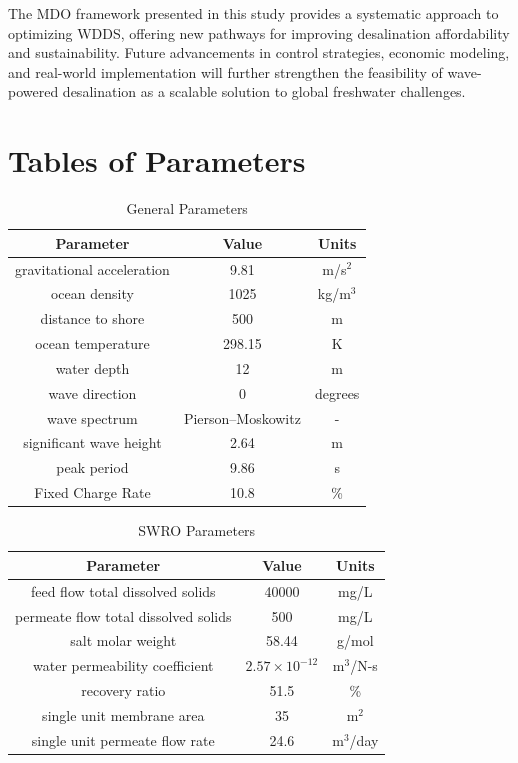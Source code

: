 \documentclass[twocolumn,10pt]{asme2e}
\begin{document}
The MDO framework presented in this study provides a systematic approach to optimizing WDDS, offering new pathways for improving desalination affordability and sustainability. Future advancements in control strategies, economic modeling, and real-world implementation will further strengthen the feasibility of wave-powered desalination as a scalable solution to global freshwater challenges.




\appendix
\newpage
\section{Tables of Parameters} \label{app:params}
\begin{table}[h]
    \centering
    \caption{General Parameters}
    \begin{tabular}{|c|c|c|}
        \hline
        \textbf{Parameter} & \textbf{Value} & \textbf{Units} \\
        \hline
        gravitational acceleration & 9.81 & m/s$^2$ \\
        ocean density & 1025 & kg/m$^3$ \\
        distance to shore & 500 & m \\
        ocean temperature & 298.15 & K \\
        water depth & 12 & m \\
        wave direction & 0 & degrees \\
        
        wave spectrum & Pierson–Moskowitz & -  \\
        significant wave height & 2.64 & m \\
        peak period & 9.86 & s \\

        Fixed Charge Rate & 10.8 & \% \\
        \hline
    \end{tabular}
    \label{tab:paramsgeneral}
\end{table}

\begin{table}[h]
    \centering
    \caption{SWRO Parameters}
    \begin{tabular}{|c|c|c|}
        \hline
        \textbf{Parameter} & \textbf{Value} & \textbf{Units} \\
        \hline
        feed flow total dissolved solids & 40000 & mg/L \\
        permeate flow total dissolved solids & 500 & mg/L \\
        salt molar weight & 58.44 & g/mol \\
        water permeability coefficient & $2.57\times10^{-12}$ & m$^3$/N-s \\
        recovery ratio & 51.5 & \% \\
        single unit membrane area & 35 & m$^2$ \\
        single unit permeate flow rate & 24.6 & m$^3$/day \\
        \hline
    \end{tabular}
    \label{tab:paramsswro}
\end{table}
\end{document}

